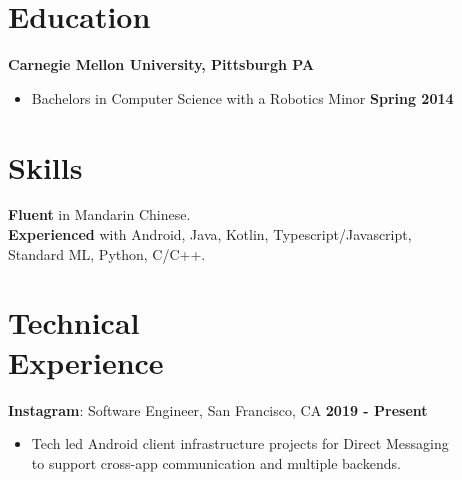 \documentclass[sectioned]{dsyangres}
\begin{document}


\address{
 \hfill 791 Hamilton Drive \\
  \hfill Pleasant Hill, CA 94523
   }


\begin{resume}


\section{Education}

\textbf{Carnegie Mellon University, Pittsburgh PA}
  \begin{itemize}
    \item Bachelors in Computer Science with a Robotics Minor \hfill \textbf{ Spring 2014}
  \end{itemize}


\section{Skills}
\textbf{Fluent} in Mandarin Chinese. \\
\textbf{Experienced} with Android, Java, Kotlin, Typescript/Javascript, \\ Standard ML, Python, C/C++.

\section{Technical \\ Experience}
\textbf{Instagram}: Software Engineer, San Francisco, CA \hfill \textbf{2019 - Present}
  \begin{itemize}
      \item Tech led Android client infrastructure projects for Direct Messaging
        \\ to support cross-app communication and multiple backends. 
  \end{itemize}


\end{resume}
\end{document}
